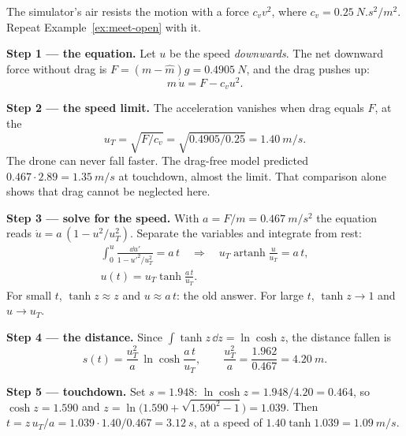 \begin{example}
\label{ex:meet-drag}
The simulator's air resists the motion with a force $c_v v^2$, where $c_v = \SI{0.25}{N.s^2/m^2}$. Repeat Example~\ref{ex:meet-open} with it.

\textbf{Step 1 — the equation.} Let $u$ be the speed \emph{downwards}. The net downward force without drag is $F = (m - \hat m)g = \SI{0.4905}{N}$, and the drag pushes up:
\begin{equation*}
  m\,\dot u = F - c_v u^2 .
\end{equation*}

\textbf{Step 2 — the speed limit.} The acceleration vanishes when drag equals $F$, at the 
\begin{equation*}
  u_T = \sqrt{F/c_v} = \sqrt{0.4905/0.25} = \SI{1.40}{m/s}.
\end{equation*}
The drone can never fall faster. The drag-free model predicted $0.467 \cdot 2.89 = \SI{1.35}{m/s}$ at touchdown, almost the limit. That comparison alone shows that drag cannot be neglected here.

\textbf{Step 3 — solve for the speed.} With $a = F/m = \SI{0.467}{m/s^2}$ the equation reads $\dot u = a\,(1 - u^2/u_T^2)$. Separate the variables and integrate from rest:
\begin{gather*}
  \int_0^u \frac{\dd u'}{1 - u'^2/u_T^2} = a\,t
  \quad\Longrightarrow\quad
  u_T \operatorname{artanh}\frac{u}{u_T} = a\,t ,\\
  u(t) = u_T \tanh\frac{a\,t}{u_T}.
\end{gather*}
For small $t$, $\tanh z \approx z$ and $u \approx a\,t$: the old answer. For large $t$, $\tanh z \to 1$ and $u \to u_T$.

\textbf{Step 4 — the distance.} Since $\int\tanh z\,\dd z = \ln\cosh z$, the distance fallen is
\begin{equation*}
  s(t) = \frac{u_T^2}{a}\,\ln\cosh\frac{a\,t}{u_T}, \qquad \frac{u_T^2}{a} = \frac{1.962}{0.467} = \SI{4.20}{m}.
\end{equation*}

\textbf{Step 5 — touchdown.} Set $s = 1.948$: $\ln\cosh z = 1.948/4.20 = 0.464$, so $\cosh z = 1.590$ and $z = \ln\!\big(1.590 + \sqrt{1.590^2 - 1}\big) = 1.039$. Then $t = z\,u_T/a = 1.039 \cdot 1.40/0.467 = \SI{3.12}{s}$, at a speed of $1.40\tanh 1.039 = \SI{1.09}{m/s}$.


\end{example}
